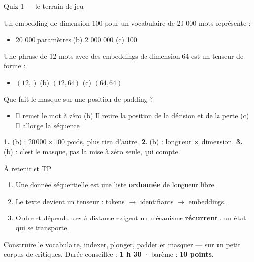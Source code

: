 \begin{frame}{Quiz 1 --- le terrain de jeu}
\begin{qbox}[Question 1]
Un embedding de dimension 100 pour un vocabulaire de 20 000 mots représente :
\begin{itemize}
  \item[(a)] 20 000 paramètres \quad (b) 2 000 000 \quad (c) 100
\end{itemize}
\end{qbox}
\begin{qbox}[Question 2]
Une phrase de 12 mots avec des embeddings de dimension 64 est un tenseur de forme :
\begin{itemize}
  \item[(a)] $(12,)$ \quad (b) $(12, 64)$ \quad (c) $(64, 64)$
\end{itemize}
\end{qbox}
\begin{qbox}[Question 3]
Que fait le masque sur une position de padding ?
\begin{itemize}
  \item[(a)] Il remet le mot à zéro \quad (b) Il retire la position de la décision
  et de la perte \quad (c) Il allonge la séquence
\end{itemize}
\end{qbox}
\begin{solbox}[Réponses]
\textbf{1.} (b) : $20\,000 \times 100$ poids, plus rien d'autre. \quad
\textbf{2.} (b) : longueur × dimension. \quad
\textbf{3.} (b) : c'est le masque, pas la mise à zéro seule, qui compte.
\end{solbox}
\end{frame}

\begin{frame}{À retenir et TP}
\begin{kbox}
\begin{enumerate}
  \item Une donnée séquentielle est une liste \textbf{ordonnée} de longueur libre.
  \item Le texte devient un tenseur : tokens $\to$ identifiants $\to$ embeddings.
  \item Ordre et dépendances à distance exigent un mécanisme \textbf{récurrent} :
  un état qui se transporte.
\end{enumerate}
\end{kbox}
\vspace{1.5mm}
\begin{abox}
Construire le vocabulaire, indexer, plonger, padder et masquer --- sur un petit corpus
de critiques. Durée conseillée : \textbf{1 h 30} · barème : \textbf{10 points}.
\end{abox}
\end{frame}

